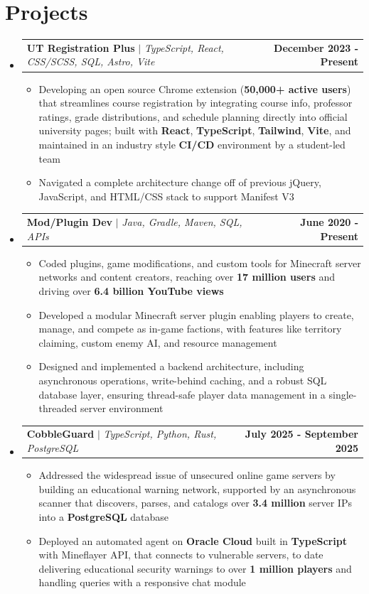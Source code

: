 \documentclass[letterpaper,11pt]{article}
\makeatletter
\newcommand{\resumeItem}[1]{
  \item\small{
    {#1 \vspace{-2pt}}
  }
}
\newcommand{\resumeProjectHeading}[2]{
    \item
    \begin{tabular*}{1.001\textwidth}{l@{\extracolsep{\fill}}r}
      \small#1 & \textbf{\small #2}\\
    \end{tabular*}\vspace{-7pt}
}
\newcommand{\resumeSubHeadingListStart}{\begin{itemize}[leftmargin=0.0in, label={}]}
\newcommand{\resumeSubHeadingListEnd}{\end{itemize}}
\newcommand{\resumeItemListStart}{\begin{itemize}}
\newcommand{\resumeItemListEnd}{\end{itemize}\vspace{-5pt}}
\makeatother
\begin{document}
{\section{Projects}
\vspace{-5pt}
\resumeSubHeadingListStart
\resumeProjectHeading
{\textbf{UT Registration Plus} $|$ \emph{TypeScript, React, CSS/SCSS, SQL, Astro, Vite}}{December 2023 - Present}
\resumeItemListStart
\resumeItem{Developing an open source Chrome extension (\textbf{50,000+ active users}) that streamlines course registration by integrating course info, professor ratings, grade distributions, and schedule planning directly into official university pages; built with \textbf{React}, \textbf{TypeScript}, \textbf{Tailwind}, \textbf{Vite}, and maintained in an industry style \textbf{CI/CD} environment by a student-led team}
\resumeItem{Navigated a complete architecture change off of previous jQuery, JavaScript, and HTML/CSS stack to support Manifest V3}
\resumeItemListEnd
\vspace{-13pt}
\resumeProjectHeading
{\textbf{Mod/Plugin Dev} $|$ \emph{Java, Gradle, Maven, SQL, APIs}}{June 2020 - Present}
\resumeItemListStart
\resumeItem{Coded plugins, game modifications, and custom tools for Minecraft server networks and content creators, reaching over \textbf{17 million users} and driving over \textbf{6.4 billion YouTube views}}
\resumeItem{Developed a modular Minecraft server plugin enabling players to create, manage, and compete as in-game factions, with features like territory claiming, custom enemy AI, and resource management}
\resumeItem{Designed and implemented a backend architecture, including asynchronous operations, write-behind caching, and a robust SQL database layer, ensuring thread-safe player data management in a single-threaded server environment}
\resumeItemListEnd 
\vspace{-13pt}
\resumeProjectHeading
{\textbf{CobbleGuard} $|$ \emph{TypeScript, Python, Rust, PostgreSQL}}{July 2025 - September 2025}
\resumeItemListStart
\resumeItem{Addressed the widespread issue of unsecured online game servers by building an educational warning network, supported by an asynchronous scanner that discovers, parses, and catalogs over \textbf{3.4 million} server IPs into a \textbf{PostgreSQL} database}
\resumeItem{Deployed an automated agent on \textbf{Oracle Cloud} built in \textbf{TypeScript} with Mineflayer API, that connects to vulnerable servers, to date delivering educational security warnings to over \textbf{1 million players} and handling queries with a responsive chat module} 
\resumeItemListEnd
\resumeSubHeadingListEnd


}
\end{document}
